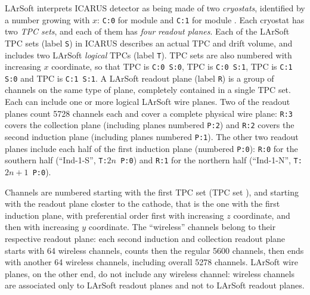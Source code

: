 LArSoft interprets ICARUS detector as being made of two \emph{cryostats},
identified by a number growing with $x$:
\texttt{C:0} for module  and \texttt{C:1} for module .
Each cryostat has two \emph{TPC sets}, and each of them has \emph{four}
\emph{readout planes}.
Each of the LArSoft TPC sets (label \texttt{S}) in ICARUS describes an actual TPC and drift
volume, and includes two LArSoft \emph{logical} TPCs (label \texttt{T}).
TPC sets are also numbered with increasing $x$ coordinate, so that
TPC  is \texttt{C:0 S:0}, TPC  is \texttt{C:0 S:1},
TPC  is \texttt{C:1 S:0} and TPC  is \texttt{C:1 S:1}.
A LArSoft readout plane (label \texttt{R}) is a group of channels on the same type of plane,
completely contained in a single TPC set.
Each can include one or more logical LArSoft wire planes.
Two of the readout planes count 5728 channels each and cover a complete physical wire
plane: \texttt{R:3} covers the collection plane (including planes numbered \texttt{P:2})
and \texttt{R:2} covers the second induction plane (including planes numbered \texttt{P:1}).
The other two readout planes include each half of the first induction plane (numbered \texttt{P:0}):
\texttt{R:0} for the southern half (``Ind-1-S'', \texttt{T:$2n$ P:0})
and \texttt{R:1} for the northern half (``Ind-1-N'', \texttt{T:$2n+1$ P:0}).

Channels are numbered starting with the first TPC set (TPC set ),
and starting with the readout plane closter to the cathode,
that is the one with the first induction plane, with preferential order first
with increasing $z$ coordinate, and then with increasing $y$ coordinate.
The ``wireless'' channels belong to their respective readout plane:
each second induction and collection readout plane starts with 64 wireless channels,
counts then the regular 5600 channels, then ends with another 64 wireless channels,
including overall 5278 channels.
LArSoft wire planes, on the other end, do not include any wireless channel:
wireless channels are associated only to LArSoft readout planes
and not to LArSoft readout planes.

